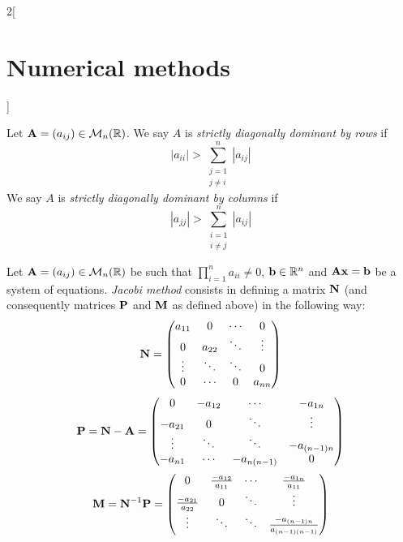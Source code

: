 \documentclass[../../../main_math.tex]{subfiles}
\begin{document}
\begin{multicols}{2}[\section{Numerical methods}]
\begin{proposition}
  \end{proposition}
  \begin{definition}
    Let $\boldsymbol{\mathrm{A}}=(a_{ij})\in\mathcal{M}_n(\mathbb{R})$. We say $A$ is \emph{strictly diagonally dominant by rows} if $$|a_{ii}|>\sum_{\substack{j=1\\j\ne i}}^n|a_{ij}|$$
    We say $A$ is \emph{strictly diagonally dominant by columns} if $$|a_{jj}|>\sum_{\substack{i=1\\i\ne j}}^n|a_{ij}|$$
  \end{definition}
  \begin{definition}
    Let $\boldsymbol{\mathrm{A}}=(a_{ij})\in\mathcal{M}_n(\mathbb{R})$ be such that $\prod_{i=1}^na_{ii}\ne 0$, $\boldsymbol{\mathrm{b}}\in\mathbb{R}^n$ and $\boldsymbol{\mathrm{A}}\boldsymbol{\mathrm{x}}=\boldsymbol{\mathrm{b}}$ be a system of equations. \emph{Jacobi method} consists in defining a matrix $\boldsymbol{\mathrm{N}}$ (and consequently matrices $\boldsymbol{\mathrm{P}}$ and $\boldsymbol{\mathrm{M}}$ as defined above) in the following way:
    \begin{equation*}
      \boldsymbol{\mathrm{N}}=
      \begin{pmatrix}
        a_{11} & 0      & \cdots & 0      \\
        0      & a_{22} & \ddots & \vdots \\
        \vdots & \ddots & \ddots & 0      \\
        0      & \cdots & 0      & a_{nn}
      \end{pmatrix}
    \end{equation*}
    \begin{equation*}
      \boldsymbol{\mathrm{P}}=\boldsymbol{\mathrm{N}}-\boldsymbol{\mathrm{A}}=
      \begin{pmatrix}
        0       & -a_{12} & \cdots      & -a_{1n}     \\
        -a_{21} & 0       & \ddots      & \vdots      \\
        \vdots  & \ddots  & \ddots      & -a_{(n-1)n} \\
        -a_{n1} & \cdots  & -a_{n(n-1)} & 0
      \end{pmatrix}
    \end{equation*}
    \begin{equation*}
      \boldsymbol{\mathrm{M}}=\boldsymbol{\mathrm{N}}^{-1}\boldsymbol{\mathrm{P}}=
      \begin{pmatrix}
        0                      & \frac{-a_{12}}{a_{11}} & \cdots                     & \frac{-a_{1n}}{a_{11}}             \\
        \frac{-a_{21}}{a_{22}} & 0                      & \ddots                     & \vdots                             \\
        \vdots                 & \ddots                 & \ddots                     & \frac{-a_{(n-1)n}}{a_{(n-1)(n-1)}} \\

\end{pmatrix}
\end{equation*}
\end{definition}
\end{multicols}
\end{document}
